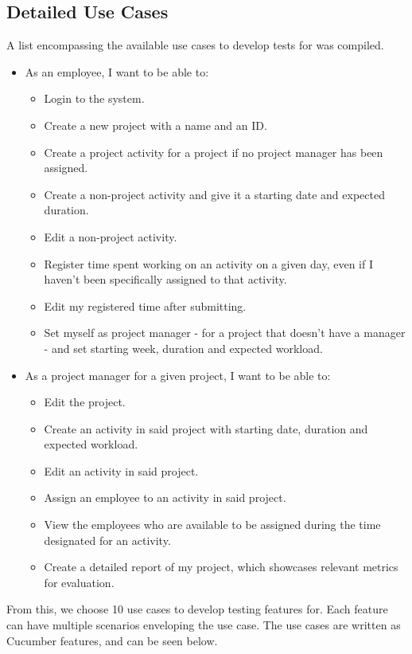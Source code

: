 \subsection{Detailed Use Cases} \label{cucumber}
\noindent A list encompassing the available use cases to develop tests for was compiled.
\begin{itemize}
    \item As an employee, I want to be able to:
    \begin{itemize}
        \item Login to the system.%
        \item Create a new project with a name and an ID.%
        \item Create a project activity for a project if no project manager has been assigned.
        \item Create a non-project activity and give it a starting date and expected duration.%
        \item Edit a non-project activity.
        \item Register time spent working on an activity on a given day, even if I haven't been specifically assigned to that activity.%
        \item Edit my registered time after submitting.
        \item Set myself as project manager - for a project that doesn't have a manager - and set starting week, duration and expected workload.%
    \end{itemize}
    \item As a project manager for a given project, I want to be able to:
    \begin{itemize}
        \item Edit the project.%
        \item Create an activity in said project with starting date, duration and expected workload.%
        \item Edit an activity in said project.
        \item Assign an employee to an activity in said project. %
        \item View the employees who are available to be assigned during the time designated for an activity.%
        \item Create a detailed report of my project, which showcases relevant metrics for evaluation.%
    \end{itemize}
\end{itemize}
From this, we choose 10 use cases to develop testing features for. Each feature can have multiple scenarios enveloping the use case. The use cases are written as Cucumber features, and can be seen below.





